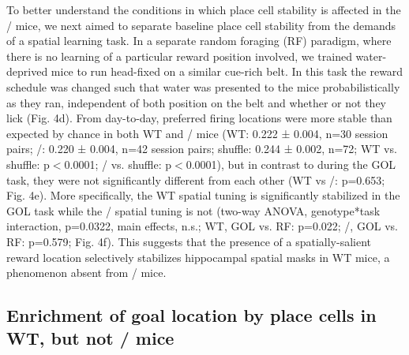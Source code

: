 To better understand the conditions in which place cell stability is affected in the \df/ mice, we next aimed to separate baseline place cell stability from the demands of a spatial learning task.  In a separate random foraging (RF) paradigm, where there is no learning of a particular reward position involved, we trained water-deprived mice to run head-fixed on a similar cue-rich belt. In this task the reward schedule was changed such that water was presented to the mice probabilistically as they ran, independent of both position on the belt and whether or not they lick (Fig. 4d). From day-to-day, preferred firing locations were more stable than expected by chance in both WT and \df/ mice (WT: 0.222 ± 0.004, n=30 session pairs; \df/: 0.220 ± 0.004, n=42 session pairs; shuffle: 0.244 ± 0.002, n=72; WT vs. shuffle: p$<$0.0001; \df/ vs. shuffle: p$<$0.0001), but in contrast to during the GOL task, they were not significantly different from each other (WT vs \df/: p=0.653; Fig. 4e). More specifically, the WT spatial tuning is significantly stabilized in the GOL task while the \df/ spatial tuning is not (two-way ANOVA, genotype*task interaction, p=0.0322, main effects, n.s.; WT, GOL vs. RF: p=0.022; \df/, GOL vs. RF: p=0.579; Fig. 4f). This suggests that the presence of a spatially-salient reward location selectively stabilizes hippocampal spatial masks in WT mice, a phenomenon absent from \df/ mice.

\subsection{Enrichment of goal location by place cells in WT, but not \df/ mice}

